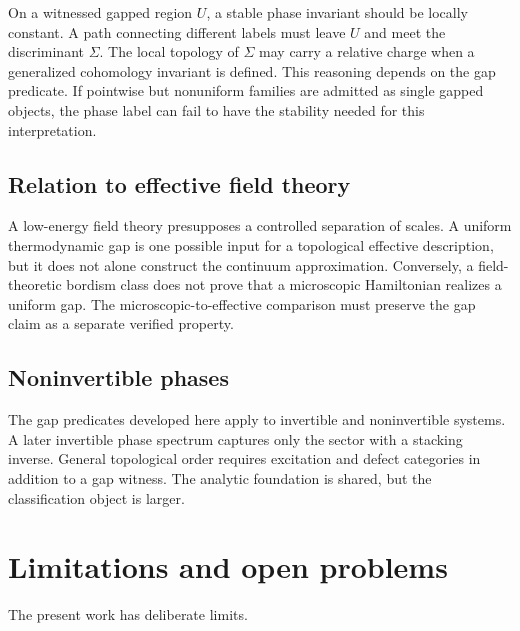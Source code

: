 \documentclass[12pt]{article}
\theoremstyle{definition}
\theoremstyle{remark}
\begin{document}
On a witnessed gapped region $U$, a stable phase invariant should be locally
constant. A path connecting different labels must leave $U$ and meet the
discriminant $\Sigma$. The local topology of $\Sigma$ may carry a relative
charge when a generalized cohomology invariant is defined. This reasoning
depends on the gap predicate. If pointwise but nonuniform families are admitted
as single gapped objects, the phase label can fail to have the stability needed
for this interpretation.

\subsection{Relation to effective field theory}

A low-energy field theory presupposes a controlled separation of scales. A
uniform thermodynamic gap is one possible input for a topological effective
description, but it does not alone construct the continuum approximation.
Conversely, a field-theoretic bordism class does not prove that a microscopic
Hamiltonian realizes a uniform gap. The microscopic-to-effective comparison
must preserve the gap claim as a separate verified property.

\subsection{Noninvertible phases}

The gap predicates developed here apply to invertible and noninvertible
systems. A later invertible phase spectrum captures only the sector with a
stacking inverse. General topological order requires excitation and defect
categories in addition to a gap witness. The analytic foundation is shared,
but the classification object is larger.

\section{Limitations and open problems}

The present work has deliberate limits.
\end{document}
